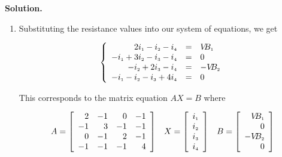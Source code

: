 \begin{ex}
\begin{enumerate}
\end{enumerate}

{\bf Solution.}  

\begin{enumerate}

\item  Substituting the resistance values into our system of equations, we get

\[ \left\{ \begin{array}{rcl} 2i_{\mbox{\tiny$1$}} - i_{\mbox{\tiny$2$}}-i_{\mbox{\tiny$4$}} & = & V\!\!B_{\mbox{\tiny$1$}} \\
-i_{\mbox{\tiny$1$}} + 3i_{\mbox{\tiny$2$}} - i_{\mbox{\tiny$3$}} - i_{\mbox{\tiny$4$}} & = & 0 \\
-i_{\mbox{\tiny$2$}} + 2i_{\mbox{\tiny$3$}} - i_{\mbox{\tiny$4$}} & = & -V\!\!B_{\mbox{\tiny$2$}} \\
-i_{\mbox{\tiny$1$}} - i_{\mbox{\tiny$2$}}-i_{\mbox{\tiny$3$}} + 4i_{\mbox{\tiny$4$}} & = & 0 \\  \end{array} \right.\]
                              
This corresponds to the matrix equation $AX = B$ where 

\[ \begin{array}{ccc} 

A = \left[ \begin{array}{rrrr} 2 & -1 & 0 & -1  \\ -1 & 3 & -1 & -1 \\ 0 & -1 & 2 & -1 \\ -1 & -1 & -1 & 4 \end{array} \right] 

&

 X = \left[ \begin{array}{r} i_{\mbox{\tiny$1$}} \\ i_{\mbox{\tiny$2$}} \\ i_{\mbox{\tiny$3$}} \\ i_{\mbox{\tiny$4$}} \\ \end{array} \right]
 
&

 B = \left[ \begin{array}{r} V\!\!B_{\mbox{\tiny$1$}} \\ 0 \\ -V\!\!B_{\mbox{\tiny$2$}} \\ 0 \end{array} \right] 
 \end{array}\]   


\end{enumerate}
\end{ex}
